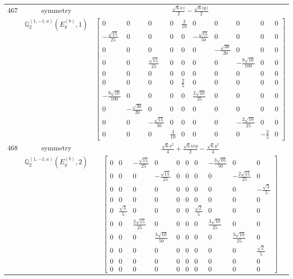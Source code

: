 \documentclass[fleqn,8pt,landscape]{jsarticle}
\begin{document}
\begin{longtable}{ccc}
$ 467 $ & $ \text{symmetry} $ & $ \frac{\sqrt{6} x z}{2} - \frac{\sqrt{6} i y z}{2} $ \\
$  $ & $ \mathbb{Q}_{2}^{(1,-1;a)}(E_{g}^{(b)},1) $ & $ \begin{bmatrix} 0 & 0 & 0 & 0 & \frac{3}{10} & 0 & 0 & 0 & 0 & 0 \\ - \frac{\sqrt{15}}{25} & 0 & 0 & 0 & 0 & - \frac{\sqrt{15}}{50} & 0 & 0 & 0 & 0 \\ 0 & 0 & 0 & 0 & 0 & 0 & - \frac{\sqrt{30}}{20} & 0 & 0 & 0 \\ 0 & 0 & \frac{\sqrt{15}}{25} & 0 & 0 & 0 & 0 & - \frac{9 \sqrt{10}}{100} & 0 & 0 \\ 0 & 0 & 0 & 0 & 0 & 0 & 0 & 0 & 0 & 0 \\ 0 & 0 & 0 & 0 & \frac{2}{5} & 0 & 0 & 0 & 0 & 0 \\ - \frac{9 \sqrt{10}}{100} & 0 & 0 & 0 & 0 & \frac{2 \sqrt{10}}{25} & 0 & 0 & 0 & 0 \\ 0 & - \frac{\sqrt{30}}{20} & 0 & 0 & 0 & 0 & 0 & 0 & 0 & 0 \\ 0 & 0 & - \frac{\sqrt{15}}{50} & 0 & 0 & 0 & 0 & - \frac{2 \sqrt{10}}{25} & 0 & 0 \\ 0 & 0 & 0 & \frac{3}{10} & 0 & 0 & 0 & 0 & - \frac{2}{5} & 0 \end{bmatrix} $ \\ \hline
$ 468 $ & $ \text{symmetry} $ & $ \frac{\sqrt{6} x^{2}}{4} + \frac{\sqrt{6} i x y}{2} - \frac{\sqrt{6} y^{2}}{4} $ \\
$  $ & $ \mathbb{Q}_{2}^{(1,-1;a)}(E_{g}^{(b)},2) $ & $ \begin{bmatrix} 0 & 0 & - \frac{\sqrt{15}}{25} & 0 & 0 & 0 & 0 & - \frac{3 \sqrt{10}}{50} & 0 & 0 \\ 0 & 0 & 0 & - \frac{\sqrt{15}}{25} & 0 & 0 & 0 & 0 & - \frac{2 \sqrt{15}}{25} & 0 \\ 0 & 0 & 0 & 0 & 0 & 0 & 0 & 0 & 0 & - \frac{\sqrt{3}}{5} \\ 0 & 0 & 0 & 0 & 0 & 0 & 0 & 0 & 0 & 0 \\ 0 & \frac{\sqrt{3}}{5} & 0 & 0 & 0 & 0 & \frac{\sqrt{2}}{5} & 0 & 0 & 0 \\ 0 & 0 & \frac{2 \sqrt{15}}{25} & 0 & 0 & 0 & 0 & \frac{3 \sqrt{10}}{25} & 0 & 0 \\ 0 & 0 & 0 & \frac{3 \sqrt{10}}{50} & 0 & 0 & 0 & 0 & \frac{3 \sqrt{10}}{25} & 0 \\ 0 & 0 & 0 & 0 & 0 & 0 & 0 & 0 & 0 & \frac{\sqrt{2}}{5} \\ 0 & 0 & 0 & 0 & 0 & 0 & 0 & 0 & 0 & 0 \\ 0 & 0 & 0 & 0 & 0 & 0 & 0 & 0 & 0 & 0 \end{bmatrix} $ \\ \hline

\end{longtable}
\end{document}
